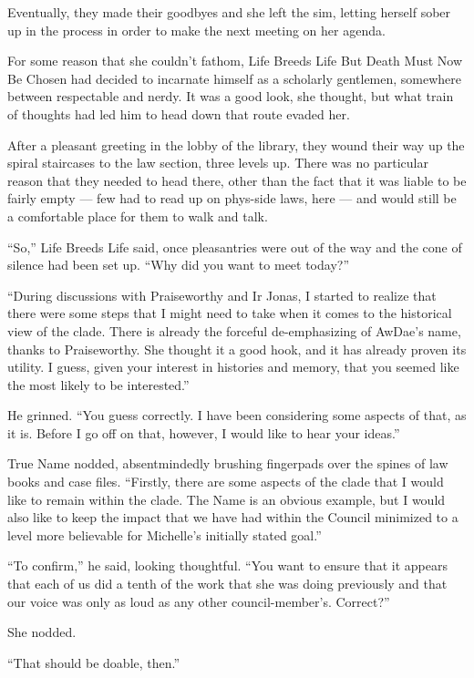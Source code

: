 Eventually, they made their goodbyes and she left the sim, letting herself sober up in the process in order to make the next meeting on her agenda.

For some reason that she couldn't fathom, Life Breeds Life But Death Must Now Be Chosen had decided to incarnate himself as a scholarly gentlemen, somewhere between respectable and nerdy. It was a good look, she thought, but what train of thoughts had led him to head down that route evaded her.

After a pleasant greeting in the lobby of the library, they wound their way up the spiral staircases to the law section, three levels up. There was no particular reason that they needed to head there, other than the fact that it was liable to be fairly empty — few had to read up on phys-side laws, here — and would still be a comfortable place for them to walk and talk.

``So,'' Life Breeds Life said, once pleasantries were out of the way and the cone of silence had been set up. ``Why did you want to meet today?''

``During discussions with Praiseworthy and Ir Jonas, I started to realize that there were some steps that I might need to take when it comes to the historical view of the clade. There is already the forceful de-emphasizing of AwDae's name, thanks to Praiseworthy. She thought it a good hook, and it has already proven its utility. I guess, given your interest in histories and memory, that you seemed like the most likely to be interested.''

He grinned. ``You guess correctly. I have been considering some aspects of that, as it is. Before I go off on that, however, I would like to hear your ideas.''

True Name nodded, absentmindedly brushing fingerpads over the spines of law books and case files. ``Firstly, there are some aspects of the clade that I would like to remain within the clade. The Name is an obvious example, but I would also like to keep the impact that we have had within the Council minimized to a level more believable for Michelle's initially stated goal.''

``To confirm,'' he said, looking thoughtful. ``You want to ensure that it appears that each of us did a tenth of the work that she was doing previously and that our voice was only as loud as any other council-member's. Correct?''

She nodded.

``That should be doable, then.''

